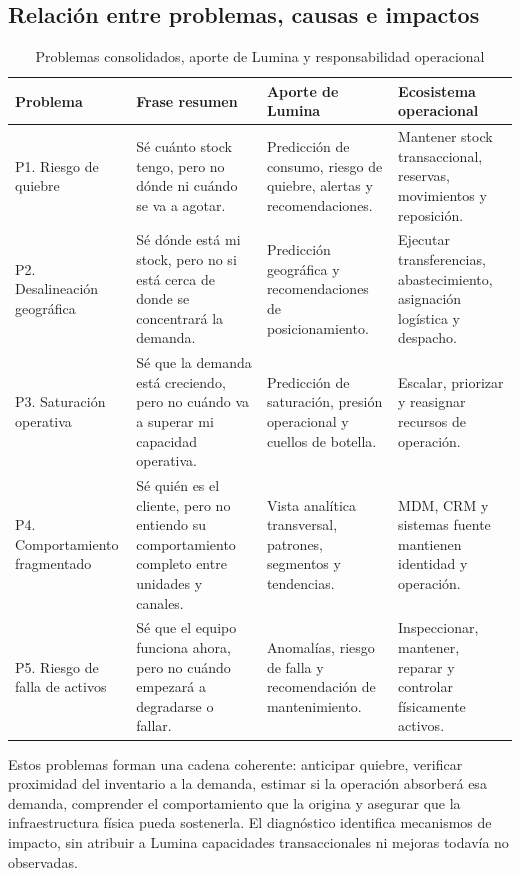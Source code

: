 \documentclass[11pt,a4paper]{article}
\begin{document}
\subsection{Relación entre problemas, causas e impactos}
\begin{table}[H]
\caption{Problemas consolidados, aporte de Lumina y responsabilidad operacional}\label{tab:diagnostico}
\scriptsize
\begin{tabularx}{\linewidth}{@{}P{.18\linewidth}P{.24\linewidth}YY@{}}\toprule
Problema & Frase resumen & Aporte de Lumina & Ecosistema operacional\\\midrule
P1. Riesgo de quiebre & Sé cuánto stock tengo, pero no dónde ni cuándo se va a agotar. & Predicción de consumo, riesgo de quiebre, alertas y recomendaciones. & Mantener stock transaccional, reservas, movimientos y reposición.\\
P2. Desalineación geográfica & Sé dónde está mi stock, pero no si está cerca de donde se concentrará la demanda. & Predicción geográfica y recomendaciones de posicionamiento. & Ejecutar transferencias, abastecimiento, asignación logística y despacho.\\
P3. Saturación operativa & Sé que la demanda está creciendo, pero no cuándo va a superar mi capacidad operativa. & Predicción de saturación, presión operacional y cuellos de botella. & Escalar, priorizar y reasignar recursos de operación.\\
P4. Comportamiento fragmentado & Sé quién es el cliente, pero no entiendo su comportamiento completo entre unidades y canales. & Vista analítica transversal, patrones, segmentos y tendencias. & MDM, CRM y sistemas fuente mantienen identidad y operación.\\
P5. Riesgo de falla de activos & Sé que el equipo funciona ahora, pero no cuándo empezará a degradarse o fallar. & Anomalías, riesgo de falla y recomendación de mantenimiento. & Inspeccionar, mantener, reparar y controlar físicamente activos.\\\bottomrule
\end{tabularx}
\end{table}

Estos problemas forman una cadena coherente: anticipar quiebre, verificar proximidad del inventario a la demanda, estimar si la operación absorberá esa demanda, comprender el comportamiento que la origina y asegurar que la infraestructura física pueda sostenerla. El diagnóstico identifica mecanismos de impacto, sin atribuir a Lumina capacidades transaccionales ni mejoras todavía no observadas.
\end{document}

